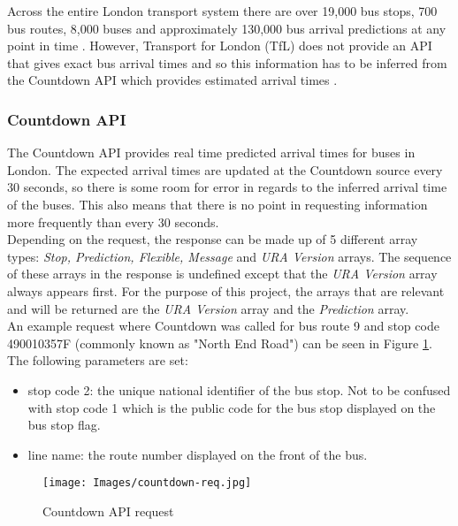 Across the entire London transport system there are over 19,000 bus stops, 700 bus routes, 8,000 buses and approximately 130,000 bus arrival predictions at any point in time \cite{tfl-bus-documentation}. However, Transport for London (TfL) does not provide an API that gives exact bus arrival times and so this information has to be inferred from the Countdown API which provides estimated arrival times \cite{tfl-api}.

\subsubsection{Countdown API}

The Countdown API provides real time predicted arrival times for buses in London. The expected arrival times are updated at the Countdown source every 30 seconds, so there is some room for error in regards to the inferred arrival time of the buses. This also means that there is no point in requesting information more frequently than every 30 seconds. \\

Depending on the request, the response can be made up of 5 different array types: \textit{Stop, Prediction, Flexible, Message} and \textit{URA Version} arrays. The sequence of these arrays in the response is undefined except that the \textit{URA Version} array always appears first. For the purpose of this project, the arrays that are relevant and will be returned are the \textit{URA Version} array and the \textit{Prediction} array. \\

An example request where Countdown was called for bus route 9 and stop code 490010357F (commonly known as "North End Road") can be seen in Figure \ref{fig:countdown-req}. The following parameters are set: 
\begin{itemize}
    \item stop code 2: the unique national identifier of the bus stop. Not to be confused with stop code 1 which is the public code for the bus stop displayed on the bus stop flag.
    \item line name: the route number displayed on the front of the bus.
\end{itemize}

\begin{figure}[H]
\begin{center}
    \texttt{[image: Images/countdown-req.jpg]}
    \caption{Countdown API request}
    \label{fig:countdown-req}
\end{center}
\end{figure}

